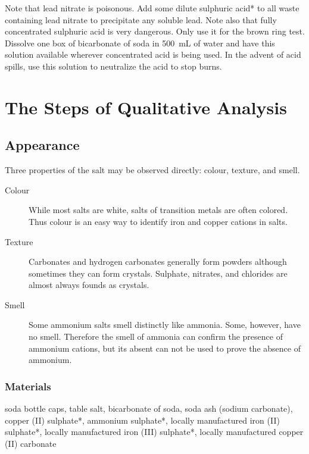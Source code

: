 Note that lead nitrate is poisonous. Add some dilute sulphuric acid* to all waste containing lead nitrate to precipitate any soluble lead. Note also that fully concentrated sulphuric acid is very dangerous. Only use it for the brown ring test. Dissolve one box of bicarbonate of soda in 500~mL of water and have this solution available wherever concentrated acid is being used. In the advent of acid spills, use this solution to neutralize the acid to stop burns.
\section{The Steps of Qualitative Analysis}

\subsection{Appearance}

Three properties of the salt may be observed directly: colour, texture, and smell.
\begin{description}

\item[Colour]{While most salts are white, salts of transition metals are often colored. Thus colour is an easy way to identify iron and copper cations in salts.}

\item[Texture]{Carbonates and hydrogen carbonates generally form powders although sometimes they can form crystals. Sulphate, nitrates, and chlorides are almost always founds as crystals.}

\item[Smell]{Some ammonium salts smell distinctly like ammonia. Some, however, have no smell. Therefore the smell of ammonia can confirm the presence of ammonium cations, but its absent can not be used to prove the absence of ammonium.}

\end{description}

\subsubsection{Materials}
soda bottle caps, table salt, bicarbonate of soda, soda ash (sodium carbonate), copper (II) sulphate*, ammonium sulphate*, locally manufactured iron (II) sulphate*, locally manufactured iron (III) sulphate*, locally manufactured copper (II) carbonate

